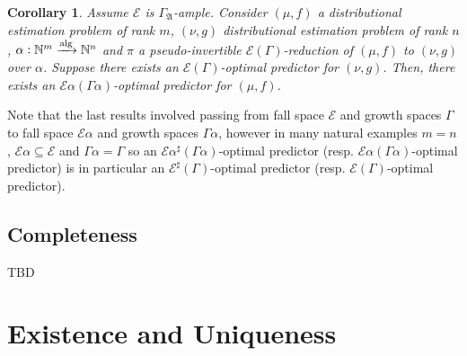 \documentclass{article}
\numberwithin{equation}{section}
\theoremstyle{definition}
\theoremstyle{plain}
\newtheorem{corollary}{Corollary}[section]
\newcommand{\Nats}{\mathbb{N}}
\newcommand{\GrowA}{\Gamma_{\mathfrak{A}}}
\newcommand{\Fall}{\mathcal{E}}
\newcommand{\EG}{\Fall(\Gamma)}
\newcommand{\ESG}{\Fall^\sharp(\Gamma)}
\newcommand{\Alg}{\xrightarrow{\textnormal{alg}}}
\begin{document}
\begin{samepage}
\begin{corollary}

Assume ${\Fall}$ is ${\GrowA}$-ample. Consider $(\mu,f)$ a distributional estimation problem of rank ${m}$, $(\nu,g)$ distributional estimation problem of rank ${n}$, ${\alpha: \Nats^m \Alg \Nats^n}$ and $\pi$ a pseudo-invertible $\EG$-reduction of $(\mu, f)$ to $(\nu, g)$ over ${\alpha}$. Suppose there exists an $\EG$-optimal predictor for $(\nu, g)$. Then, there exists an $\Fall \alpha (\Gamma \alpha)$-optimal predictor for $(\mu, f)$.

\end{corollary}
\end{samepage}

Note that the last results involved passing from fall space ${\Fall}$ and growth spaces ${\Gamma}$ to fall space ${\Fall \alpha}$ and growth spaces ${\Gamma \alpha}$, however in many natural examples ${m = n}$, ${\Fall \alpha \subseteq \Fall}$ and ${\Gamma \alpha = \Gamma}$ so an ${\Fall \alpha^\sharp(\Gamma \alpha)}$-optimal predictor (resp. ${\Fall \alpha(\Gamma \alpha)}$-optimal predictor) is in particular an ${\ESG}$-optimal predictor (resp. ${\EG}$-optimal predictor).

\subsection{Completeness}

TBD

\section{Existence and Uniqueness}
\label{sec:e_and_u}

 
\end{document}
